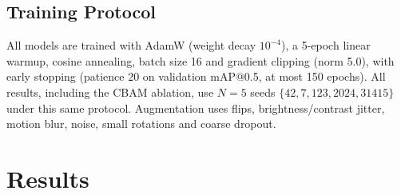 \documentclass[pdflatex,sn-mathphys-num,iicol]{sn-jnl}%
\begin{document}
\subsection{Training Protocol}\label{sec:protocol}
All models are trained with AdamW (weight decay $10^{-4}$), a 5-epoch
linear warmup, cosine annealing, batch size 16 and gradient clipping (norm
5.0), with early stopping (patience 20 on validation mAP@0.5, at most 150
epochs). All results, including the CBAM ablation, use $N{=}5$ seeds
$\{42, 7, 123, 2024, 31415\}$ under this same protocol. Augmentation uses
flips, brightness/contrast jitter, motion blur, noise, small rotations and
coarse dropout.

\section{Results}\label{sec:results}
\end{document}
